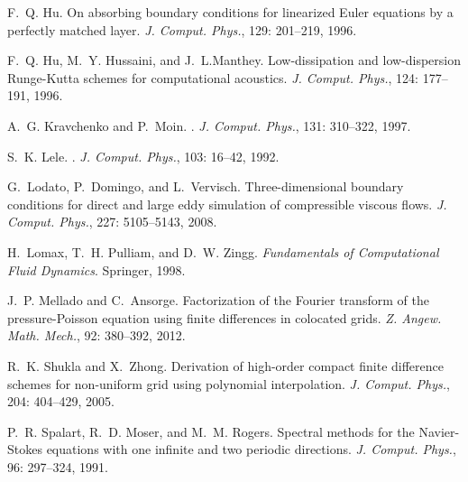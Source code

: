\documentclass[a4paper,11pt]{book}
\begin{document}
\begin{thebibliography}{20}
F.~Q. Hu.
\newblock On absorbing boundary conditions for linearized {E}uler equations by
  a perfectly matched layer.
\newblock \emph{J. Comput. Phys.}, 129: 201--219, 1996.

F.~Q. Hu, M.~Y. Hussaini, and J.~L.Manthey.
\newblock Low-dissipation and low-dispersion {R}unge-{K}utta schemes for
  computational acoustics.
\newblock \emph{J. Comput. Phys.}, 124: 177--191, 1996.

A.~G. Kravchenko and P.~Moin.
.
\newblock \emph{J. Comput. Phys.}, 131: 310--322, 1997.

S.~K. Lele.
.
\newblock \emph{J. Comput. Phys.}, 103: 16--42, 1992.

G.~Lodato, P.~Domingo, and L.~Vervisch.
\newblock Three-dimensional boundary conditions for direct and large eddy
  simulation of compressible viscous flows.
\newblock \emph{J. Comput. Phys.}, 227: 5105--5143, 2008.

H.~Lomax, T.~H. Pulliam, and D.~W. Zingg.
\newblock \emph{Fundamentals of Computational Fluid Dynamics}.
\newblock Springer, 1998.

J.~P. Mellado and C.~Ansorge.
\newblock Factorization of the {F}ourier transform of the pressure-{P}oisson
  equation using finite differences in colocated grids.
\newblock \emph{Z. Angew. Math. Mech.}, 92: 380--392, 2012.

R.~K. Shukla and X.~Zhong.
\newblock Derivation of high-order compact finite difference schemes for
  non-uniform grid using polynomial interpolation.
\newblock \emph{J. Comput. Phys.}, 204: 404--429, 2005.

P.~R. Spalart, R.~D. Moser, and M.~M. Rogers.
\newblock Spectral methods for the {N}avier-{S}tokes equations with one
  infinite and two periodic directions.
\newblock \emph{J. Comput. Phys.}, 96: 297--324, 1991.


\end{thebibliography}
\end{document}
